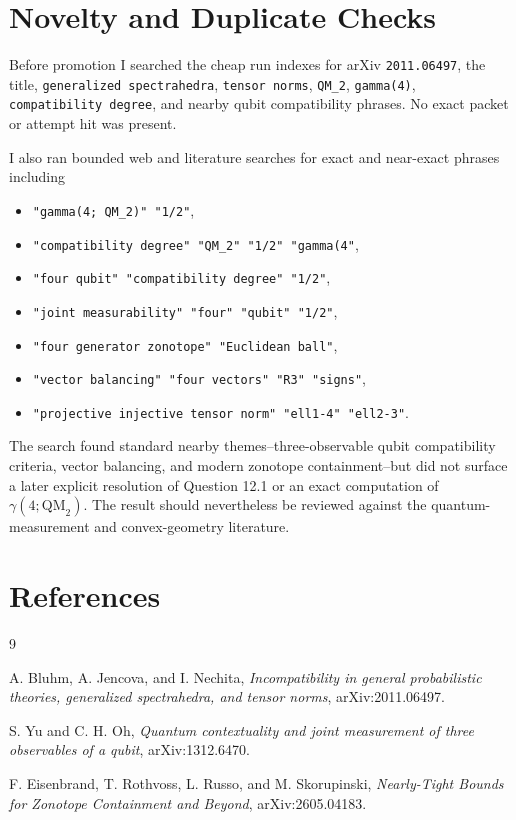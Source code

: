 \documentclass[11pt]{article}
\begin{document}
\section*{Novelty and Duplicate Checks}

Before promotion I searched the cheap run indexes for arXiv \texttt{2011.06497}, the title,
\texttt{generalized spectrahedra}, \texttt{tensor norms}, \texttt{QM\_2}, \texttt{gamma(4)},
\texttt{compatibility degree}, and nearby qubit compatibility phrases.  No exact packet or
attempt hit was present.

I also ran bounded web and literature searches for exact and near-exact phrases including
\begin{itemize}
\item \texttt{"gamma(4; QM\_2)" "1/2"},
\item \texttt{"compatibility degree" "QM\_2" "1/2" "gamma(4"},
\item \texttt{"four qubit" "compatibility degree" "1/2"},
\item \texttt{"joint measurability" "four" "qubit" "1/2"},
\item \texttt{"four generator zonotope" "Euclidean ball"},
\item \texttt{"vector balancing" "four vectors" "R3" "signs"},
\item \texttt{"projective injective tensor norm" "ell1-4" "ell2-3"}.
\end{itemize}
The search found standard nearby themes--three-observable qubit compatibility criteria,
vector balancing, and modern zonotope containment--but did not surface a later explicit
resolution of Question 12.1 or an exact computation of \(\gamma(4;\mathrm{QM}_2)\).
The result should nevertheless be reviewed against the quantum-measurement and convex-geometry
literature.

\section*{References}

\begin{thebibliography}{9}

A. Bluhm, A. Jencova, and I. Nechita,
\emph{Incompatibility in general probabilistic theories, generalized spectrahedra, and tensor norms},
arXiv:2011.06497.

S. Yu and C. H. Oh,
\emph{Quantum contextuality and joint measurement of three observables of a qubit},
arXiv:1312.6470.

F. Eisenbrand, T. Rothvoss, L. Russo, and M. Skorupinski,
\emph{Nearly-Tight Bounds for Zonotope Containment and Beyond},
arXiv:2605.04183.

\end{thebibliography}
\end{document}
